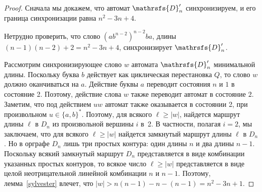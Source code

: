 \documentclass[11pt]{article}
\newcommand{\ssw}{reset word of minimum length}
\begin{document}
\begin{proof}

Сначала мы докажем, что автомат $\mathrsfs{D}'_n$ синхронизируем, и его граница синхронизации
равна $n^2-3n+4$.

Нетрудно проверить, что слово $(ab^{n - 2})^{n - 2}ba$, длины 
$(n - 1)(n - 2) + 2 = n^2 -3n + 4$, синхронизирует $\mathrsfs{D}'_n$.


%

Рассмотрим синхронизирующее слово $w$ автомата $\mathrsfs{D}'_n$ минимальной
длины. Поскольку буква $b$ действует как циклическая перестановка $Q$, 
то слово $w$ должно оканчиваться на $a$. Действие буквы $a$ переводит
состояния $n$ и $1$ в состояние 2. Поэтому, действие слова $w$ также
переводит автомат в состояние $2$. Заметим, что под действием $uw$ автомат также
оказывается в состоянии 2, при произвольном $u\in\{a,b\}^*$.
Поэтому, для всякого $\ell\ge|w|$, найдется маршрут длины $\ell$ в $D_n$ из
произвольной вершины $i$ в~2. В частности, полагая $i=2$, мы заключаем, что 
для всякого $\ell\ge|w|$ найдется замкнутый маршрут длины $\ell$ в $D_n$. 
Но в орграфе $D_n$ лишь три простых контура: один длины $n$ и два длины $n-1$.
Поскольку всякий замкнутый маршрут $D_n$ представляется в виде комбинации
указанных простых контуров, то всякое число $\ell\ge|w|$ представляется в виде
целой неотрицательной линейной комбинации $n$ и $n-1$. 
Поэтому, лемма~\ref{sylvester} влечет, что $|w|>n(n-1)-n-(n-1)=n^2-3n+1$.





\end{proof}
\end{document}
